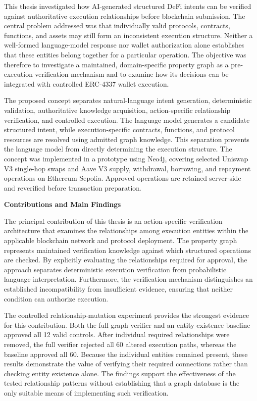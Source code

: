 
This thesis investigated how AI-generated structured DeFi intents
can be verified against authoritative execution relationships
before blockchain submission. The central problem addressed was
that individually valid protocols, contracts, functions, and assets
may still form an inconsistent execution structure. Neither a
well-formed language-model response nor wallet authorization alone
establishes that these entities belong together for a particular
operation. The objective was therefore to investigate a maintained,
domain-specific property graph as a pre-execution verification
mechanism and to examine how its decisions can be integrated
with controlled ERC-4337 wallet execution.

The proposed concept separates natural-language intent generation,
deterministic validation, authoritative knowledge acquisition,
action-specific relationship verification, and controlled execution.
The language model generates a candidate structured intent, while
execution-specific contracts, functions, and protocol resources
are resolved using admitted graph knowledge. This separation
prevents the language model from directly determining the
execution structure. The concept was implemented in a prototype
using Neo4j, covering selected Uniswap V3 single-hop swaps and
Aave V3 supply, withdrawal, borrowing, and repayment operations
on Ethereum Sepolia. Approved operations are retained server-side
and reverified before transaction preparation.

\medskip
\noindent\textbf{Contributions and Main Findings}

The principal contribution of this thesis is an action-specific
verification architecture that examines the relationships among
execution entities within the applicable blockchain network and
protocol deployment. The property graph represents maintained
verification knowledge against which structured operations are
checked. By explicitly evaluating the relationships required for
approval, the approach separates deterministic execution
verification from probabilistic language interpretation.
Furthermore, the verification mechanism distinguishes an
established incompatibility from insufficient evidence, ensuring
that neither condition can authorize execution.

The controlled relationship-mutation experiment provides the
strongest evidence for this contribution. Both the full graph
verifier and an entity-existence baseline approved all 12 valid
controls. After individual required relationships were removed,
the full verifier rejected all 60 altered execution paths,
whereas the baseline approved all 60. Because the individual
entities remained present, these results demonstrate the value
of verifying their required connections rather than checking
entity existence alone. The findings support the effectiveness
of the tested relationship patterns without establishing that
a graph database is the only suitable means of implementing
such verification.

